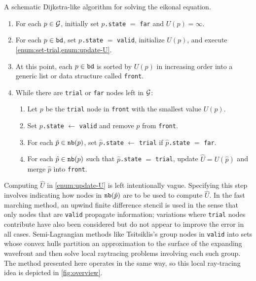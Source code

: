 \documentclass[eikonal.tex]{subfiles}
\begin{document}
\begin{algorithm}
  \caption{A schematic Dijkstra-like algorithm for solving the eikonal
    equation.}\label{alg:dijkstra-like}
  \begin{enumerate}[nolistsep]
  \item For each $p \in \mathcal{G}$, initially set $p$\texttt{.state} $=$
    \texttt{far} and $U(p) = \infty$.
  \item For each $p \in \texttt{bd}$, set $p$\texttt{.state} $=$
    \texttt{valid}, initialize $U(p)$, and execute
    \cref{enum:set-trial,enum:update-U}.
  \item At this point, each $p \in \texttt{bd}$ is sorted by $U(p)$ in
    increasing order into a generic list or data structure called
    \texttt{front}.
  \item While there are \texttt{trial} or \texttt{far} nodes left in
    $\mathcal{G}$:
    \begin{enumerate}[nolistsep]
    \item Let $p$ be the \texttt{trial} node in \texttt{front} with
      the smallest value $U(p)$.
    \item Set $p$\texttt{.state} $\gets$ \texttt{valid} and remove $p$
      from \texttt{front}.
    \item For each $\hat{p} \in \texttt{nb}(p)$, set
      $\hat{p}$\texttt{.state} $\gets$ \texttt{trial} if
      $\hat{p}$\texttt{.state} $=$ \texttt{far}.\label{enum:set-trial}
    \item For each $\hat{p} \in \texttt{nb}(p)$ such that
      $\hat{p}$\texttt{.state} $=$ \texttt{trial}, update
      $\hat{U} = U(\hat{p})$ and merge $\hat{p}$ into
      \texttt{front}.\label{enum:update-U}
    \end{enumerate}
  \end{enumerate}
\end{algorithm}

Computing $\hat{U}$ in \cref{enum:update-U} is left intentionally
vague. Specifying this step involves indicating how nodes in
$\texttt{nb}(\hat{p})$ are to be used to compute $\hat{U}$. In the fast
marching method, an upwind finite difference stencil is used in the
sense that only nodes that are \texttt{valid} propagate information;
variations where \texttt{trial} nodes contribute have also been
considered but do not appear to improve the error in all
cases. Semi-Lagrangian methods like Tsitsiklis's group nodes in
\texttt{valid} into sets whose convex hulls partition an approximation
to the surface of the expanding wavefront and then solve local
raytracing problems involving each such group. The method presented
here operates in the same way, so this local ray-tracing idea is
depicted in \cref{fig:overview}.
\end{document}
